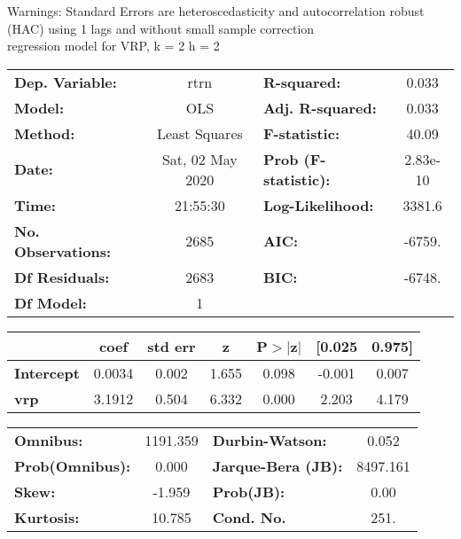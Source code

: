 Warnings: \newline
 [1] Standard Errors are heteroscedasticity and autocorrelation robust (HAC) using 1 lags and without small sample correction\\ 

regression model for VRP, k = 2 h = 2\begin{center}
\begin{tabular}{lclc}
\toprule
\textbf{Dep. Variable:}    &       rtrn       & \textbf{  R-squared:         } &     0.033   \\
\textbf{Model:}            &       OLS        & \textbf{  Adj. R-squared:    } &     0.033   \\
\textbf{Method:}           &  Least Squares   & \textbf{  F-statistic:       } &     40.09   \\
\textbf{Date:}             & Sat, 02 May 2020 & \textbf{  Prob (F-statistic):} &  2.83e-10   \\
\textbf{Time:}             &     21:55:30     & \textbf{  Log-Likelihood:    } &    3381.6   \\
\textbf{No. Observations:} &        2685      & \textbf{  AIC:               } &    -6759.   \\
\textbf{Df Residuals:}     &        2683      & \textbf{  BIC:               } &    -6748.   \\
\textbf{Df Model:}         &           1      & \textbf{                     } &             \\
\bottomrule
\end{tabular}
\begin{tabular}{lcccccc}
                   & \textbf{coef} & \textbf{std err} & \textbf{z} & \textbf{P$> |$z$|$} & \textbf{[0.025} & \textbf{0.975]}  \\
\midrule
\textbf{Intercept} &       0.0034  &        0.002     &     1.655  &         0.098        &       -0.001    &        0.007     \\
\textbf{vrp}       &       3.1912  &        0.504     &     6.332  &         0.000        &        2.203    &        4.179     \\
\bottomrule
\end{tabular}
\begin{tabular}{lclc}
\textbf{Omnibus:}       & 1191.359 & \textbf{  Durbin-Watson:     } &    0.052  \\
\textbf{Prob(Omnibus):} &   0.000  & \textbf{  Jarque-Bera (JB):  } & 8497.161  \\
\textbf{Skew:}          &  -1.959  & \textbf{  Prob(JB):          } &     0.00  \\
\textbf{Kurtosis:}      &  10.785  & \textbf{  Cond. No.          } &     251.  \\
\bottomrule
\end{tabular}
\end{center}

